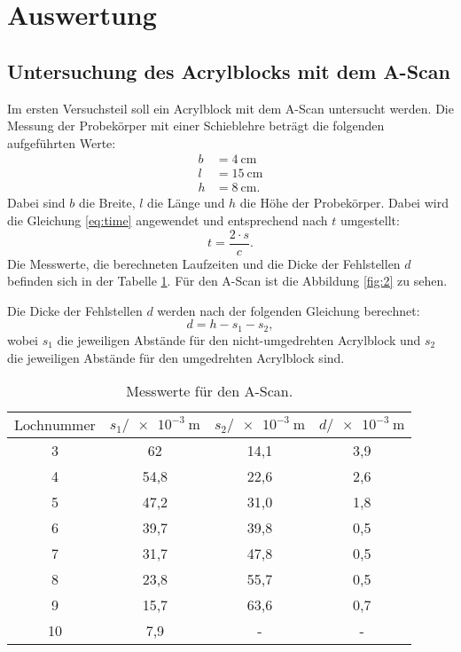 \section{Auswertung}
\label{sec:Auswertung}
\subsection{Untersuchung des Acrylblocks mit dem A-Scan}
Im ersten Versuchsteil soll ein Acrylblock mit dem A-Scan untersucht werden. Die Messung der Probekörper mit einer Schieblehre beträgt die folgenden aufgeführten Werte:
\begin{align*}
b &= \SI{4}{\cm} \\
l &= \SI{15}{\cm} \\
h &= \SI{8}{\cm}.
\end{align*}
Dabei sind $b$ die Breite, $l$ die Länge und $h$ die Höhe der Probekörper. Dabei wird die Gleichung \ref{eq:time} angewendet und entsprechend nach $t$ umgestellt:
\begin{equation}
\label{eq:zeit}
t = \frac{2 \cdot s}{c}.
\end{equation}
Die Messwerte, die berechneten Laufzeiten und die Dicke der Fehlstellen $d$ befinden sich in der Tabelle \ref{tab:ascan}.  Für den A-Scan ist die Abbildung \ref{fig:2} zu sehen.

Die Dicke der Fehlstellen $d$ werden nach der folgenden Gleichung berechnet:
\begin{equation}
d = h - s_1 - s_2,
\end{equation}
wobei $s_1$ die jeweiligen Abstände für den nicht-umgedrehten Acrylblock und $s_2$ die jeweiligen Abstände für den umgedrehten Acrylblock sind.

\begin{table}[htpb]
	\centering
	\caption{Messwerte für den A-Scan.}
	\label{tab:ascan}
	\begin{tabular}{c c c c}
		\toprule
		$\text{Lochnummer}$ & $s_1/ \SI{e-3}{\meter} $& $s_2/ \SI{e-3}{\meter} $ & $d / \SI{e-3}{\meter}$ \\
		\midrule
		3 & 62   & 14,1 & 3,9 \\
		4 & 54,8 & 22,6 & 2,6 \\
		5 & 47,2 & 31,0 & 1,8 \\
		6 & 39,7 & 39,8 & 0,5 \\
		7 & 31,7 & 47,8 & 0,5 \\
		8 & 23,8 & 55,7 & 0,5 \\
		9 & 15,7 & 63,6 & 0,7 \\
		10 & 7,9 &  -   & - \\
		\bottomrule
	\end{tabular}
\end{table}

